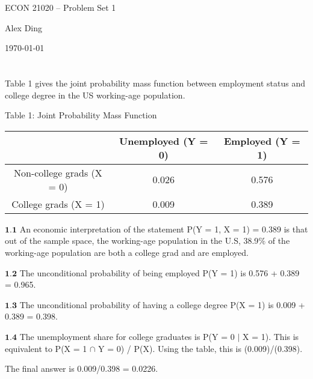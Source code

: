 



{\LARGE \centering ECON 21020 -- Problem Set 1\par}
{\vspace{-1em} \large \centering Alex Ding \par}
{\centering \vspace{-1em} \today \par }

\section{}
Table 1 gives the joint probability mass function between employment status and college degree in the US working-age population.
\begin{center}
Table 1: Joint Probability Mass Function
\end{center}

\begin{table}[h!]
\centering
 \begin{tabular}{||c c c||} 
 \hline
 & Unemployed (Y = 0) & Employed (Y = 1)  \\ [0.5ex] 
 \hline\hline
 Non-college grads (X = 0) & 0.026 & 0.576 \\ 
 College grads (X = 1) & 0.009 & 0.389 \\ [1ex] 
 \hline
 \end{tabular}
\end{table}
 
 $\textbf{1.1}$ An economic interpretation of the statement P(Y = 1, X = 1) = 0.389 is that out of the sample space, the working-age population in the U.S, 38.9$\%$ of the working-age population are both a college grad and are employed.
 
 $\textbf{1.2}$ The unconditional probability of being employed P(Y = 1) is 0.576 + 0.389 = 0.965.
 
$\textbf{1.3}$ The unconditional probability of having a college degree P(X = 1) is 0.009 + 0.389 = 0.398.
 
$\textbf{1.4}$ The unemployment share for college graduates is P(Y = 0 $\mid$ X = 1). 
 This is equivalent to P(X = 1 $\cap$ Y = 0) / P(X). Using the table, this is (0.009)/(0.398).
 
 The final answer is 0.009/0.398 = 0.0226.
 
